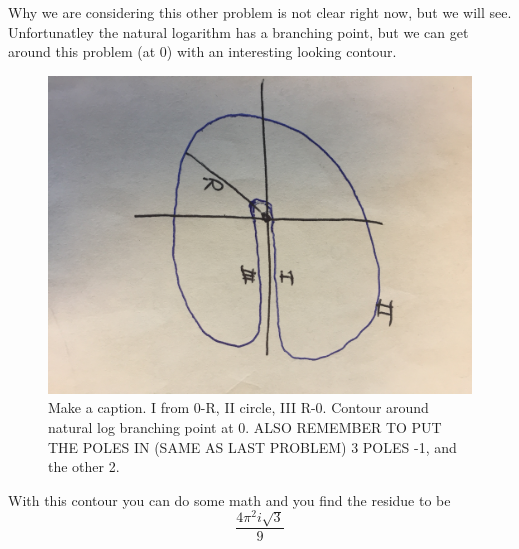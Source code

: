 \documentclass{article}
\newcommand{\be}{\begin{equation}}
\newcommand{\ee}{\end{equation}}
\begin{document}
Why we are considering this other problem is not clear right now, but we will see.
Unfortunatley the natural logarithm has a branching point, but we can get around this problem (at 0) with an interesting looking contour. 
\begin{figure}[H]
  \centering
    \includegraphics[scale=0.2]{Figures/log.png}
    \caption{Make a caption. I from 0-R, II circle, III R-0. Contour around natural log branching point at 0. ALSO REMEMBER TO PUT THE POLES IN (SAME AS LAST PROBLEM) 3 POLES -1, and the other 2. }
\end{figure}

With this contour you can do some math and you find the residue to be 
\be
\frac{4\pi^2i\sqrt{3}}{9}
\ee
\end{document}
